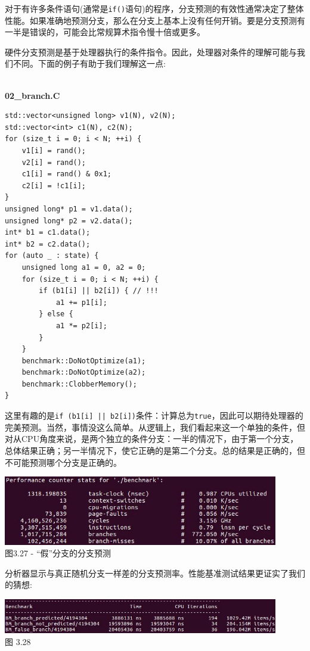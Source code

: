 对于有许多条件语句(通常是\texttt{if()}语句)的程序，分支预测的有效性通常决定了整体性能。如果准确地预测分支，那么在分支上基本上没有任何开销。要是分支预测有一半是错误的，可能会比常规算术指令慢十倍或更多。

硬件分支预测是基于处理器执行的条件指令。因此，处理器对条件的理解可能与我们不同。下面的例子有助于我们理解这一点:

\hspace*{\fill} \\ %
\noindent
\textbf{02\_branch.C}
\begin{lstlisting}[style=styleCXX]
std::vector<unsigned long> v1(N), v2(N);
std::vector<int> c1(N), c2(N);
for (size_t i = 0; i < N; ++i) {
	v1[i] = rand();
	v2[i] = rand();
	c1[i] = rand() & 0x1;
	c2[i] = !c1[i];
}
unsigned long* p1 = v1.data();
unsigned long* p2 = v2.data();
int* b1 = c1.data();
int* b2 = c2.data();
for (auto _ : state) {
	unsigned long a1 = 0, a2 = 0;
	for (size_t i = 0; i < N; ++i) {
		if (b1[i] || b2[i]) { // !!!
			a1 += p1[i];
		} else {
			a1 *= p2[i];
		}
	}
	benchmark::DoNotOptimize(a1);
	benchmark::DoNotOptimize(a2);
	benchmark::ClobberMemory();
}
\end{lstlisting}

这里有趣的是\texttt{if (b1[i] || b2[i])}条件：计算总为\texttt{true}，因此可以期待处理器的完美预测。当然，事情没这么简单。从逻辑上，我们看起来这一个单独的条件，但对从CPU角度来说，是两个独立的条件分支：一半的情况下，由于第一个分支，总体结果正确；另一半情况下，使它正确的是第二个分支。总的结果是正确的，但不可能预测哪个分支是正确的。

\begin{center}
\includegraphics[width=0.9\textwidth]{content/1/chapter3/images/27.jpg}\\
图3.27 - “假”分支的分支预测
\end{center}

分析器显示与真正随机分支一样差的分支预测率。性能基准测试结果更证实了我们的猜想:

\begin{center}
\includegraphics[width=0.9\textwidth]{content/1/chapter3/images/28.jpg}\\
图 3.28
\end{center}

